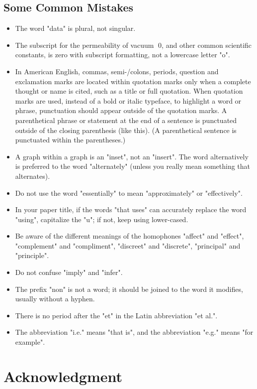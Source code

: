 \documentclass[a4paper,conference]{IEEEtran}
\begin{document}
\subsection{Some Common Mistakes}
\label{subsec4}
\begin{itemize}
\item The word "data" is plural, not singular.
\item The subscript for the permeability of vacuum 0, and other common scientific constants, is zero with subscript formatting, not a lowercase letter "o".
\item In American English, commas, semi-/colons, periods, question and exclamation marks are located within quotation marks only when a complete thought or name is cited, such as a title or full quotation. When quotation marks are used, instead of a bold or italic typeface, to highlight a word or phrase, punctuation should appear outside of the quotation marks. A parenthetical phrase or statement at the end of a sentence is punctuated outside of the closing parenthesis (like this). (A parenthetical sentence is punctuated within the parentheses.)
\item A graph within a graph is an "inset", not an "insert". The word alternatively is preferred to the word "alternately" (unless you really mean something that alternates).
\item Do not use the word "essentially" to mean "approximately" or "effectively".
\item In your paper title, if the words "that uses" can accurately replace the word "using", capitalize the "u"; if not, keep using lower-cased.
\item Be aware of the different meanings of the homophones "affect" and "effect", "complement" and "compliment", "discreet" and "discrete", "principal" and "principle".
\item Do not confuse "imply" and "infer".
\item The prefix "non" is not a word; it should be joined to the word it modifies, usually without a hyphen.
\item There is no period after the "et" in the Latin abbreviation "et al.".
\item The abbreviation "i.e." means "that is", and the abbreviation "e.g." means "for example".
\end{itemize}

\section*{Acknowledgment}
\end{document}

